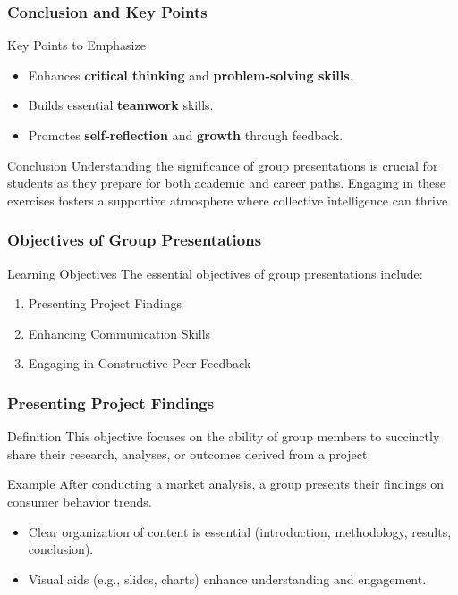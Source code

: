 \documentclass[aspectratio=169]{beamer}
\begin{document}
\begin{frame}[fragile]
    \frametitle{Conclusion and Key Points}
    \begin{block}{Key Points to Emphasize}
        \begin{itemize}
            \item Enhances \textbf{critical thinking} and \textbf{problem-solving skills}.
            \item Builds essential \textbf{teamwork} skills.
            \item Promotes \textbf{self-reflection} and \textbf{growth} through feedback.
        \end{itemize}
    \end{block}
    
    \begin{block}{Conclusion}
        Understanding the significance of group presentations is crucial for students as they prepare for both academic and career paths. Engaging in these exercises fosters a supportive atmosphere where collective intelligence can thrive.
    \end{block}
\end{frame}

\begin{frame}[fragile]
    \frametitle{Objectives of Group Presentations}
    \begin{block}{Learning Objectives}
        The essential objectives of group presentations include:
    \end{block}
    \begin{enumerate}
        \item Presenting Project Findings
        \item Enhancing Communication Skills
        \item Engaging in Constructive Peer Feedback
    \end{enumerate}
\end{frame}

\begin{frame}[fragile]
    \frametitle{Presenting Project Findings}
    \begin{block}{Definition}
        This objective focuses on the ability of group members to succinctly share their research, analyses, or outcomes derived from a project.
    \end{block}
    \begin{exampleblock}{Example}
        After conducting a market analysis, a group presents their findings on consumer behavior trends.
    \end{exampleblock}
    \begin{itemize}
        \item Clear organization of content is essential (introduction, methodology, results, conclusion).
        \item Visual aids (e.g., slides, charts) enhance understanding and engagement.
    \end{itemize}
\end{frame}
\end{document}
